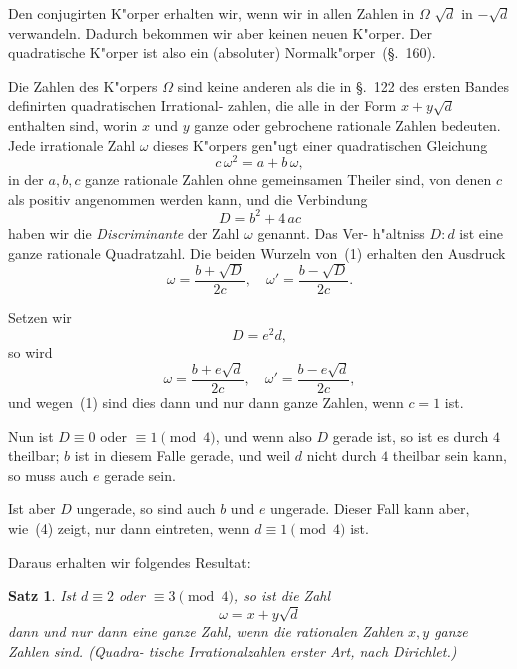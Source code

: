 \documentclass[12pt,a4paper]{article}
\theoremstyle{weber}
\newtheorem*{satz}{Satz}
\begin{document}
Den conjugirten K"orper erhalten wir, wenn wir in allen
Zahlen in $\varOmega$ $\sqrt{d}$ in $-\sqrt{d}$ verwandeln. Dadurch bekommen wir
aber keinen neuen K"orper. Der quadratische K"orper ist also
ein (absoluter) Normalk"orper~(\S.~160).

Die Zahlen des K"orpers $\varOmega$ sind keine anderen als die in
\S.~122 des ersten Bandes definirten quadratischen Irrational-
zahlen, die alle in der Form $x + y\sqrt{d}$ enthalten sind, worin
$x$ und $y$ ganze oder gebrochene rationale Zahlen bedeuten. Jede
irrationale Zahl $\omega$ dieses K"orpers gen"ugt einer quadratischen
Gleichung
\begin{equation}\label{eq:s164-1}
c\,\omega^2 = a + b\,\omega,
\end{equation}
in der $a, b, c$ ganze rationale Zahlen ohne gemeinsamen Theiler
sind, von denen $c$ als positiv angenommen werden kann, und
die Verbindung
\begin{equation}\label{eq:s164-2}
D = b^2 + 4\,ac
\end{equation}
haben wir die \emph{Discriminante} der Zahl $\omega$ genannt. Das Ver-
h"altniss $D : d$ ist eine ganze rationale Quadratzahl. Die beiden
Wurzeln von~(1) erhalten den Ausdruck
\begin{equation}\label{eq:s164-3}
\omega = \frac{b + \sqrt{D}}{2c}, \quad \omega' = \frac{b - \sqrt{D}}{2c}.
\end{equation}

Setzen wir
\begin{equation}\label{eq:s164-4}
D = e^2d,
\end{equation}
so wird
\begin{equation}\label{eq:s164-5}
\omega = \frac{b + e\sqrt{d}}{2c}, \quad \omega' = \frac{b - e\sqrt{d}}{2c},
\end{equation}
und wegen~(1) sind dies dann und nur dann ganze Zahlen, wenn
$c = 1$ ist.

Nun ist $D \equiv 0$ oder $\equiv 1 \pmod{4}$, und wenn also $D$ gerade
ist, so ist es durch $4$ theilbar; $b$ ist in diesem Falle gerade,
und weil $d$ nicht durch $4$ theilbar sein kann, so muss auch $e$
gerade sein.

Ist aber $D$ ungerade, so sind auch $b$ und $e$ ungerade. Dieser
Fall kann aber, wie~(4) zeigt, nur dann eintreten, wenn $d \equiv 1
\pmod{4}$ ist.

Daraus erhalten wir folgendes Resultat:

\begin{satz}
Ist $d \equiv 2$ oder $\equiv 3 \pmod{4}$, so ist die Zahl
\[
\omega = x + y\sqrt{d}
\]
dann und nur dann eine ganze Zahl, wenn die
rationalen Zahlen $x, y$ ganze Zahlen sind. (Quadra-
tische Irrationalzahlen erster Art, nach Dirichlet.)
\end{satz}
\end{document}

